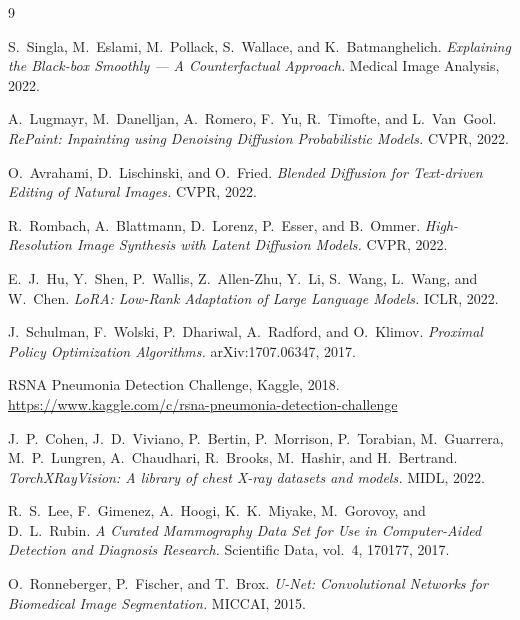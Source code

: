 \documentclass[11pt]{article}
\begin{document}
\begin{thebibliography}{9}

S.~Singla, M.~Eslami, M.~Pollack, S.~Wallace, and K.~Batmanghelich.
\textit{Explaining the Black-box Smoothly — A Counterfactual Approach.}
Medical Image Analysis, 2022.

A.~Lugmayr, M.~Danelljan, A.~Romero, F.~Yu, R.~Timofte, and L.~Van~Gool.
\textit{RePaint: Inpainting using Denoising Diffusion Probabilistic Models.}
CVPR, 2022.

O.~Avrahami, D.~Lischinski, and O.~Fried.
\textit{Blended Diffusion for Text-driven Editing of Natural Images.}
CVPR, 2022.

R.~Rombach, A.~Blattmann, D.~Lorenz, P.~Esser, and B.~Ommer.
\textit{High-Resolution Image Synthesis with Latent Diffusion Models.}
CVPR, 2022.

E.~J.~Hu, Y.~Shen, P.~Wallis, Z.~Allen-Zhu, Y.~Li, S.~Wang, L.~Wang, and
W.~Chen.
\textit{LoRA: Low-Rank Adaptation of Large Language Models.}
ICLR, 2022.

J.~Schulman, F.~Wolski, P.~Dhariwal, A.~Radford, and O.~Klimov.
\textit{Proximal Policy Optimization Algorithms.}
arXiv:1707.06347, 2017.

RSNA Pneumonia Detection Challenge, Kaggle, 2018.
\url{https://www.kaggle.com/c/rsna-pneumonia-detection-challenge}

J.~P.~Cohen, J.~D.~Viviano, P.~Bertin, P.~Morrison, P.~Torabian,
M.~Guarrera, M.~P.~Lungren, A.~Chaudhari, R.~Brooks, M.~Hashir, and
H.~Bertrand.
\textit{TorchXRayVision: A library of chest X-ray datasets and models.}
MIDL, 2022.

R.~S.~Lee, F.~Gimenez, A.~Hoogi, K.~K.~Miyake, M.~Gorovoy, and D.~L.~Rubin.
\textit{A Curated Mammography Data Set for Use in Computer-Aided Detection
and Diagnosis Research.} Scientific Data, vol.~4, 170177, 2017.

O.~Ronneberger, P.~Fischer, and T.~Brox.
\textit{U-Net: Convolutional Networks for Biomedical Image Segmentation.}
MICCAI, 2015.

\end{thebibliography}
\end{document}
